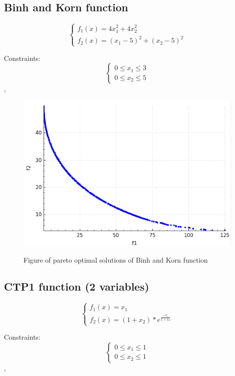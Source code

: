 \documentclass[a4paper, 11pt]{article}
\begin{document}
	\subsection{Binh and Korn function}
	$$\begin{cases}
		f_{1}(x)=4x_{1}^{2}+4x_{2}^{2}\\
		f_{2}(x)=(x_{1}-5)^{2}+(x_{2}-5)^{2}
	\end{cases}$$
		
	Constraints:
	$$\begin{cases}
		0 \leq x_{1} \leq 3\\
		0 \leq x_{2} \leq 5
	\end{cases}$$,

	\begin{figure}[H]
	\centering
	\includegraphics[scale=0.4]{binh_korn}
	\label{fig:binh_korn}
	\caption{Figure of pareto optimal solutions of Binh and Korn function}
	\end{figure}
	
	\subsection{CTP1 function (2 variables)}
	$$\begin{cases}
		f_{1}(x)=x_{1}\\
		f_{2}(x)=(1+x_{2})*e^{\frac{-x_{1}}{1+x_{2}}}
	\end{cases}$$
		
	Constraints:
	$$\begin{cases}
		0 \leq x_{1} \leq 1\\
		0 \leq x_{2} \leq 1
	\end{cases}$$,
	
\end{document}
